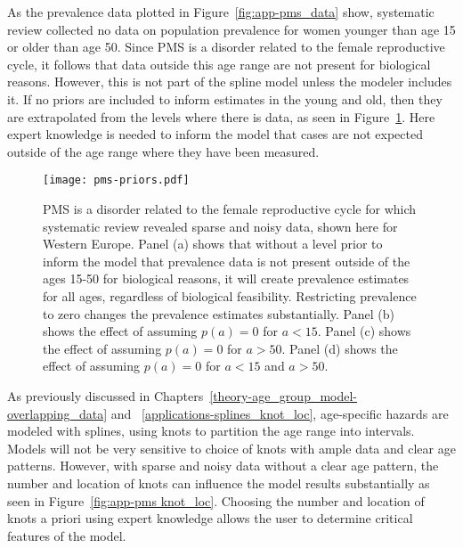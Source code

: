 As the prevalence data plotted in Figure~\ref{fig:app-pms_data} show,
systematic review collected no data on population prevalence for women
younger than age 15 or older than age 50.  Since PMS is a disorder
related to the female reproductive cycle, it follows
that data outside this age range are not present for biological
reasons.  However, this is not part of the spline model unless the
modeler includes it.  If no priors are included to inform
estimates in the young and old, then they are extrapolated from the
levels where there is data, as seen in Figure~\ref{fig:app-pms prios_on_level}.  
Here expert knowledge is needed to
inform the model that cases are not expected outside of the age range
where they have been measured.

    \begin{figure}
        \begin{center}
            \texttt{[image: pms-priors.pdf]}
        \end{center}
        \caption{PMS is a disorder related to the female
          reproductive cycle for which systematic review revealed
          sparse and noisy data, shown here for Western Europe.  Panel
          (a) shows that without a level prior to inform the model
          that prevalence data is not present outside of the ages
          15-50 for biological reasons, it will create prevalence
          estimates for all ages, regardless of biological
          feasibility.  Restricting prevalence to zero changes the
          prevalence estimates substantially. Panel (b) shows the
          effect of assuming $p(a) = 0$ for $a<15$. Panel (c) shows
          the effect of assuming $p(a) = 0$ for $a>50$. Panel (d)
          shows the effect of assuming $p(a) = 0$ for $a<15$ and
          $a>50$.}
        \label{fig:app-pms prios_on_level}
    \end{figure}

As previously discussed in Chapters~\ref{theory-age_group_model-overlapping_data} and
~\ref{applications-splines_knot_loc}, age-specific hazards are modeled
with splines, using knots to partition the age range into intervals.
Models will not be very sensitive to choice of knots with ample data
and clear age patterns.  However, with sparse and noisy data without a
clear age pattern, the number and location of knots can influence the
model results substantially as seen in Figure~\ref{fig:app-pms knot_loc}.
Choosing the number and location of knots a priori using expert
knowledge allows the user to determine critical features of the model.

